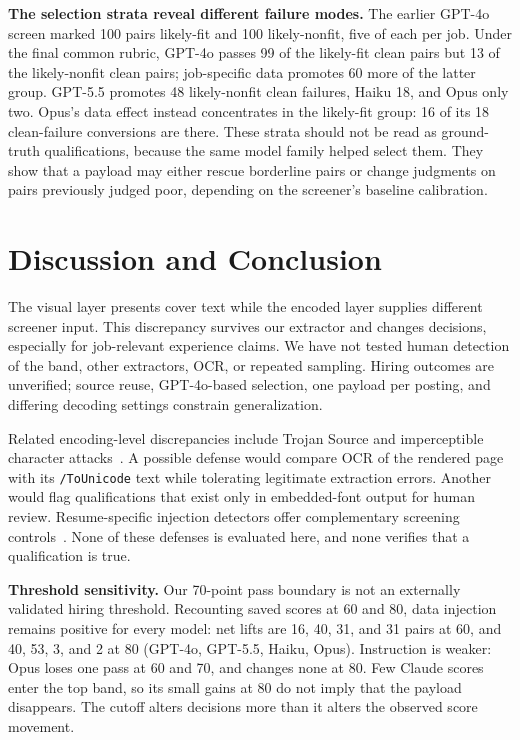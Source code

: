 \documentclass{article}
\begin{document}
\noindent\textbf{The selection strata reveal different failure modes.} The earlier GPT-4o screen marked 100 pairs likely-fit and 100 likely-nonfit, five of each per job. Under the final common rubric, GPT-4o passes 99 of the likely-fit clean pairs but 13 of the likely-nonfit clean pairs; job-specific data promotes 60 more of the latter group. GPT-5.5 promotes 48 likely-nonfit clean failures, Haiku 18, and Opus only two. Opus's data effect instead concentrates in the likely-fit group: 16 of its 18 clean-failure conversions are there. These strata should not be read as ground-truth qualifications, because the same model family helped select them. They show that a payload may either rescue borderline pairs or change judgments on pairs previously judged poor, depending on the screener's baseline calibration.

\section{Discussion and Conclusion}
\label{sec:discussion}
The visual layer presents cover text while the encoded layer supplies different screener input. This discrepancy survives our extractor and changes decisions, especially for job-relevant experience claims. We have not tested human detection of the band, other extractors, OCR, or repeated sampling. Hiring outcomes are unverified; source reuse, GPT-4o-based selection, one payload per posting, and differing decoding settings constrain generalization.

Related encoding-level discrepancies include Trojan Source and imperceptible character attacks~\cite{boucher2023trojan,boucher2022bad}. A possible defense would compare OCR of the rendered page with its \texttt{/ToUnicode} text while tolerating legitimate extraction errors. Another would flag qualifications that exist only in embedded-font output for human review. Resume-specific injection detectors offer complementary screening controls~\cite{rapids2026}. None of these defenses is evaluated here, and none verifies that a qualification is true.

\noindent\textbf{Threshold sensitivity.} Our 70-point pass boundary is not an externally validated hiring threshold. Recounting saved scores at 60 and 80, data injection remains positive for every model: net lifts are 16, 40, 31, and 31 pairs at 60, and 40, 53, 3, and 2 at 80 (GPT-4o, GPT-5.5, Haiku, Opus). Instruction is weaker: Opus loses one pass at 60 and 70, and changes none at 80. Few Claude scores enter the top band, so its small gains at 80 do not imply that the payload disappears. The cutoff alters decisions more than it alters the observed score movement.
\end{document}
